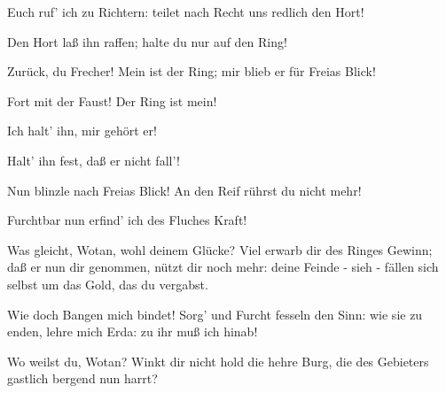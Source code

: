 \begin{drama}
Euch ruf' ich zu Richtern:
teilet nach Recht uns redlich den Hort!
 




\Logespeaks
Den Hort laß ihn raffen;
halte du nur auf den Ring!
 

\Fasoltspeaks


Zurück, du Frecher! Mein ist der Ring;
mir blieb er für Freias Blick!
 




\Fafnerspeaks
Fort mit der Faust! Der Ring ist mein!
 




\Fasoltspeaks
Ich halt' ihn, mir gehört er!
 

\Fafnerspeaks


Halt' ihn fest, daß er nicht fall'!
 




\Fafnerspeaks
Nun blinzle nach Freias Blick!
An den Reif rührst du nicht mehr!
 




\Wotanspeaks
Furchtbar nun erfind' ich des Fluches Kraft!
 

\Logespeaks
Was gleicht, Wotan, wohl deinem Glücke?
Viel erwarb dir des Ringes Gewinn;
daß er nun dir genommen, nützt dir noch mehr:
deine Feinde - sieh - fällen sich selbst
um das Gold, das du vergabst.
 

\Wotanspeaks


Wie doch Bangen mich bindet!
Sorg' und Furcht fesseln den Sinn:
wie sie zu enden, lehre mich Erda:
zu ihr muß ich hinab!
 

\Frickaspeaks


Wo weilst du, Wotan?
Winkt dir nicht hold die hehre Burg,
die des Gebieters gastlich bergend nun harrt?
 


\end{drama}
